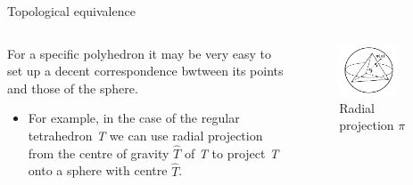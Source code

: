 \documentclass{beamer}
\begin{document}
\begin{frame}{Topological equivalence}
  \begin{columns}
    \begin{column}{0.6\textwidth}
      \begin{block}{}
        For a specific polyhedron it may be very easy to set up a decent correspondence bwtween its points and those of the sphere.
        \begin{itemize}
        \item For example, in the case of the regular tetrahedron \textsl{T} we can use radial projection from the centre of gravity $\hat T$ of \textsl{T} to project \textsl{T} onto a sphere with centre $\hat T$.
        \end{itemize}
      \end{block}
    \end{column}
    \begin{column}{0.4\textwidth}
      \begin{figure}
        \centering
        \includegraphics[width=0.7\textwidth]{figure_1_8_a.png}
        \caption{Radial projection $\pi$}
      \end{figure}
    \end{column}
  \end{columns}
\end{frame}
\end{document}
